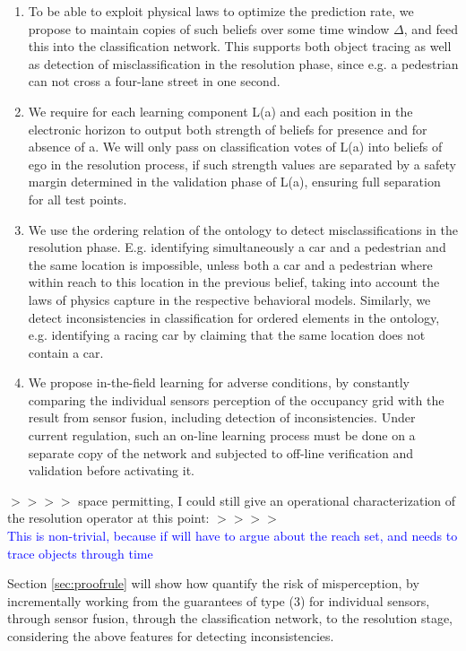 \begin{enumerate}
\item To be able to exploit physical laws to optimize the prediction rate, we propose to maintain copies of such beliefs over some time window $\Delta$, and feed this into the classification network. This supports both object tracing as well as detection of misclassification in the resolution phase, since e.g. a pedestrian can not cross a four-lane street in one second.
\item We require for each learning component L(a) and each position in the electronic horizon to output both strength of beliefs for presence and for absence of a. We will only pass on classification votes of L(a) into beliefs of ego in the resolution process, if such strength values are separated by a safety margin determined in the validation phase of L(a), ensuring full separation for all test points.
\item We use the ordering relation of the ontology to detect misclassifications in the resolution phase. E.g. identifying simultaneously a car and a pedestrian and the same location is impossible, unless both a car and a pedestrian where within reach to this location in the previous belief, taking into account the laws of physics capture in the respective behavioral models. Similarly, we detect inconsistencies in classification for ordered elements in the ontology, e.g. identifying a racing car by claiming that the same location does not contain a car.
\item We propose in-the-field learning for adverse conditions, by constantly comparing the individual sensors perception of the occupancy grid with the result from sensor fusion, including detection of inconsistencies. Under current regulation, such an on-line learning process must be done on a separate copy of the network and subjected to off-line verification and validation before activating it.
\end{enumerate}
$>>>>$ space permitting, I could still give an operational characterization of the resolution operator at this point: $>>>>$\\
\textcolor{blue}{This is non-trivial, because if will have to argue about the reach set, and needs to trace objects through time}

Section \ref{sec:proofrule} will show how quantify the risk of misperception, by incrementally working from the guarantees of type (3) for individual sensors, through sensor fusion, through the classification network, to the resolution stage, considering the above features for detecting inconsistencies.


